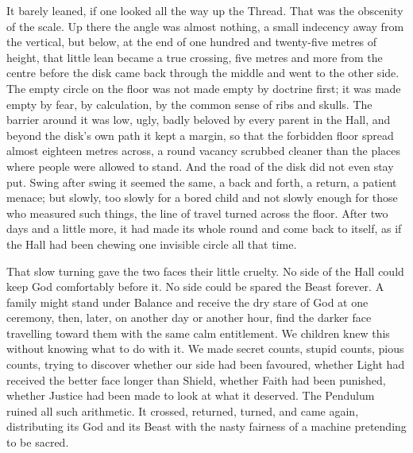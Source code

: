 It barely leaned, if one looked all the way up the Thread. 
That was the obscenity of the scale. 
Up there the angle was almost nothing, a small indecency away from the vertical, but below, at the end of one hundred and twenty-five metres of height, 
that little lean became a true crossing, five metres and more from the centre before the disk came back through the middle and went to the other side. 
The empty circle on the floor was not made empty by doctrine first; it was made empty by fear, by calculation, by the common sense of ribs and skulls. 
The barrier around it was low, ugly, badly beloved by every parent in the Hall, and beyond the disk’s own path it kept a margin, so that the forbidden 
floor spread almost eighteen metres across, a round vacancy scrubbed cleaner than the places where people were allowed to stand. 
And the road of the disk did not even stay put. Swing after swing it seemed the same, a back and forth, a return, a patient menace; 
but slowly, too slowly for a bored child and not slowly enough for those who measured such things, the line of travel turned across the floor. 
After two days and a little more, it had made its whole round and come back to itself, as if the Hall had been chewing one invisible circle all that time.\par


That slow turning gave the two faces their little cruelty. 
No side of the Hall could keep God comfortably before it. 
No side could be spared the Beast forever. 
A family might stand under Balance and receive the dry stare of God at one ceremony, then, later, on another day or another hour, 
find the darker face travelling toward them with the same calm entitlement. 
We children knew this without knowing what to do with it. 
We made secret counts, stupid counts, pious counts, trying to discover whether our side had been favoured, 
whether Light had received the better face longer than Shield, whether Faith had been punished, whether Justice had been made to look at what it deserved. 
The Pendulum ruined all such arithmetic. 
It crossed, returned, turned, and came again, distributing its God and its Beast with the nasty fairness of a machine pretending to be sacred.\par

